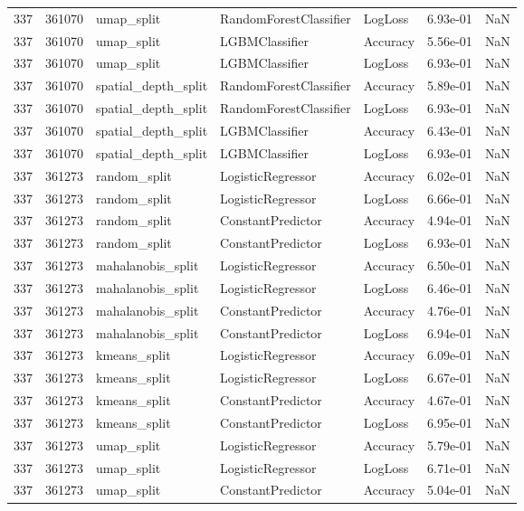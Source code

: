 \begin{tabular}{rrlllrr}
337 & 361070 & umap\_split & RandomForestClassifier & LogLoss & 6.93e-01 & NaN \\
337 & 361070 & umap\_split & LGBMClassifier & Accuracy & 5.56e-01 & NaN \\
337 & 361070 & umap\_split & LGBMClassifier & LogLoss & 6.93e-01 & NaN \\
337 & 361070 & spatial\_depth\_split & RandomForestClassifier & Accuracy & 5.89e-01 & NaN \\
337 & 361070 & spatial\_depth\_split & RandomForestClassifier & LogLoss & 6.93e-01 & NaN \\
337 & 361070 & spatial\_depth\_split & LGBMClassifier & Accuracy & 6.43e-01 & NaN \\
337 & 361070 & spatial\_depth\_split & LGBMClassifier & LogLoss & 6.93e-01 & NaN \\
337 & 361273 & random\_split & LogisticRegressor & Accuracy & 6.02e-01 & NaN \\
337 & 361273 & random\_split & LogisticRegressor & LogLoss & 6.66e-01 & NaN \\
337 & 361273 & random\_split & ConstantPredictor & Accuracy & 4.94e-01 & NaN \\
337 & 361273 & random\_split & ConstantPredictor & LogLoss & 6.93e-01 & NaN \\
337 & 361273 & mahalanobis\_split & LogisticRegressor & Accuracy & 6.50e-01 & NaN \\
337 & 361273 & mahalanobis\_split & LogisticRegressor & LogLoss & 6.46e-01 & NaN \\
337 & 361273 & mahalanobis\_split & ConstantPredictor & Accuracy & 4.76e-01 & NaN \\
337 & 361273 & mahalanobis\_split & ConstantPredictor & LogLoss & 6.94e-01 & NaN \\
337 & 361273 & kmeans\_split & LogisticRegressor & Accuracy & 6.09e-01 & NaN \\
337 & 361273 & kmeans\_split & LogisticRegressor & LogLoss & 6.67e-01 & NaN \\
337 & 361273 & kmeans\_split & ConstantPredictor & Accuracy & 4.67e-01 & NaN \\
337 & 361273 & kmeans\_split & ConstantPredictor & LogLoss & 6.95e-01 & NaN \\
337 & 361273 & umap\_split & LogisticRegressor & Accuracy & 5.79e-01 & NaN \\
337 & 361273 & umap\_split & LogisticRegressor & LogLoss & 6.71e-01 & NaN \\
337 & 361273 & umap\_split & ConstantPredictor & Accuracy & 5.04e-01 & NaN \\

\end{tabular}
